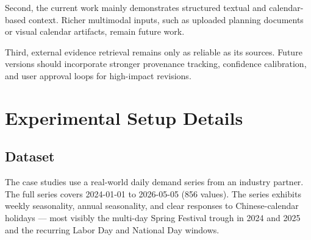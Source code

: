 \documentclass{article}
\theoremstyle{plain}
\theoremstyle{definition}
\theoremstyle{remark}
\begin{document}
Second, the current work mainly demonstrates structured textual and calendar-based context. Richer multimodal inputs, such as uploaded planning documents or visual calendar artifacts, remain future work.

Third, external evidence retrieval remains only as reliable as its sources. Future versions should incorporate stronger provenance tracking, confidence calibration, and user approval loops for high-impact revisions.




\nocite{langley00}




\newpage
\appendix
\onecolumn



\section{Experimental Setup Details}\label{app:setup}

\subsection{Dataset}
The case studies use a real-world daily demand series from an industry partner. The full series covers 2024-01-01 to 2026-05-05 (856 values). The series exhibits weekly seasonality, annual seasonality, and clear responses to Chinese-calendar holidays — most visibly the multi-day Spring Festival trough in 2024 and 2025 and the recurring Labor Day and National Day windows.
\end{document}
